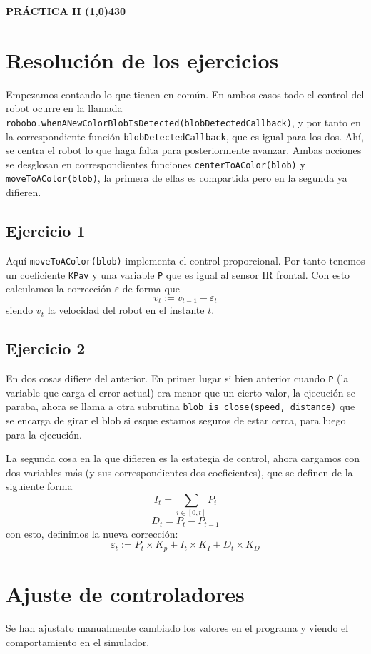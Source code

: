 \documentclass{article}
\begin{document}
\begin{center}
 \LARGE\bfseries PRÁCTICA II
 \line(1,0){430}
\end{center}

\section*{Resolución de los ejercicios}
Empezamos contando lo que tienen en común. En ambos casos todo el control del robot ocurre en la llamada \texttt{robobo.whenANewColorBlobIsDetected(blobDetectedCallback)}, y por tanto en la correspondiente función \texttt{blobDetectedCallback}, que es igual para los dos. Ahí, se centra el robot lo que haga falta para posteriormente avanzar. Ambas acciones se desglosan en correspondientes funciones \texttt{centerToAColor(blob)} y \texttt{moveToAColor(blob)}, la primera de ellas es compartida pero en la segunda ya difieren. 

\subsection*{Ejercicio 1}
Aquí \texttt{moveToAColor(blob)} implementa el control proporcional. Por tanto tenemos un coeficiente \texttt{KPav}
y una variable \texttt{P} que es igual al sensor IR frontal. Con esto calculamos la corrección $\varepsilon$ de forma que \[ v_t := v_{t-1} - \varepsilon_t \] siendo $v_t$ la velocidad del robot en el instante $t$.
\subsection*{Ejercicio 2}
En dos cosas difiere del anterior. En primer lugar si bien anterior cuando \texttt{P} (la variable que carga el error actual) era menor que un cierto valor, la ejecución se paraba, ahora se llama a otra subrutina \texttt{blob\_is\_close(speed, distance)} que se encarga de girar el blob si esque estamos seguros de estar cerca, para luego para la ejecución. 

La segunda cosa en la que difieren es la estategia de control, ahora cargamos con dos variables más (y sus correspondientes dos coeficientes), que se definen de la siguiente forma \[I_t = \sum_{i \in [0,t]} P_i \] \[D_t = P_t - P_{t-1}\] con esto, definimos la nueva corrección: \[\varepsilon_t := P_t\times K_p + I_t \times K_I + D_t \times K_D\]
\section*{Ajuste de controladores}
Se han ajustato manualmente cambiado los valores en el programa y viendo el comportamiento en el simulador.
\end{document}
